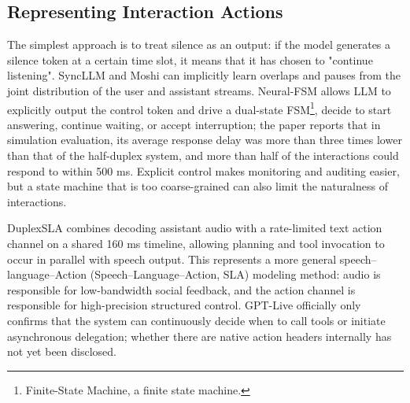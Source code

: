 \documentclass[UTF8,fontset=none,a4paper,10pt]{ctexart}
\begin{document}
\subsection{Representing Interaction Actions}

The simplest approach is to treat silence as an output: if the model generates a silence token at a certain time slot, it means that it has chosen to "continue listening". SyncLLM and Moshi can implicitly learn overlaps and pauses from the joint distribution of the user and assistant streams. Neural-FSM allows LLM to explicitly output the control token and drive a dual-state FSM\footnote{Finite-State Machine, a finite state machine. }, decide to start answering, continue waiting, or accept interruption; the paper reports that in simulation evaluation, its average response delay was more than three times lower than that of the half-duplex system, and more than half of the interactions could respond to \cite{en:wang2024neuralfsm} within 500 ms. Explicit control makes monitoring and auditing easier, but a state machine that is too coarse-grained can also limit the naturalness of interactions.

DuplexSLA combines decoding assistant audio with a rate-limited text action channel on a shared 160 ms timeline, allowing planning and tool invocation to occur in parallel with speech output\cite{en:zhang2026duplexsla}. This represents a more general speech--language--Action (Speech--Language--Action, SLA) modeling method: audio is responsible for low-bandwidth social feedback, and the action channel is responsible for high-precision structured control. GPT-Live officially only confirms that the system can continuously decide when to call tools or initiate asynchronous delegation; whether there are native action headers internally has not yet been disclosed.
\end{document}
